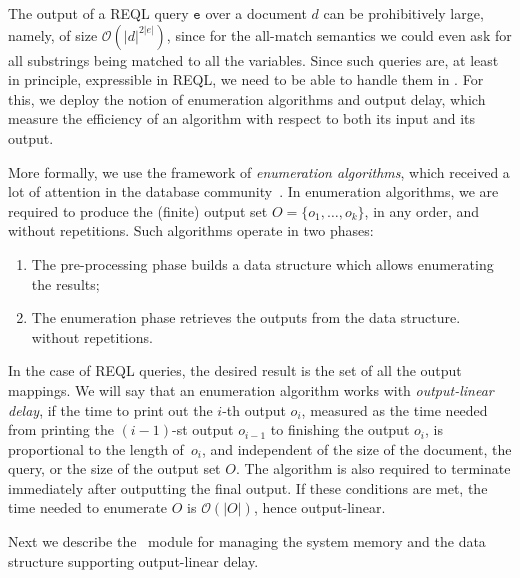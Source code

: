 
The output of a REQL query $\texttt{e}$ over a document $d$ can be prohibitively
large, namely, of size $\mathcal{O}(|d|^{2|e|})$, since for the all-match
semantics we could even ask for all substrings being matched to all the
variables. Since such queries are, at least in principle, expressible in REQL,
we need to be able to handle them in \rematch. For this, we deploy the notion of
enumeration algorithms and output delay, which measure the efficiency of an
algorithm  %
with respect to both its input and its output.

More formally, we use the framework of \emph{enumeration algorithms}, which
received a lot of attention in the database
community~\cite{AmarilliBMN-tods21,FlorenzanoRUVV20,LosemannM-lics14,SchweikardtSV-jacm22,BerkholzGS-siglog20,Segoufin13,IdrisUVVL-vldbj20,IdrisUV-sigmod17,TziavelisAGRY-pvldb20}.
In enumeration algorithms, we are required to produce the (finite) output set $O
= \{o_1,\ldots ,o_k\}$, in any order, and without repetitions. Such algorithms
operate in two phases:
\begin{enumerate}
	\item The pre-processing phase builds a data structure which allows
	enumerating the results;
	\item The enumeration phase retrieves the outputs from the data structure.%
	without repetitions.
\end{enumerate}
In the case of REQL queries, the desired result is the set of all the output
mappings. We will say that an enumeration algorithm works with
\emph{output-linear delay}, if the time to print out the $i$-th output $o_i$,
measured as the time needed from printing the $(i-1)$-st output $o_{i-1}$ to
finishing the output $o_i$, is proportional to the length of~$o_i$, and
independent of the size of the document, the query, or the size of the output
set $O$. The algorithm is also required to terminate immediately after
outputting the final output. If these conditions are met, the time needed to
enumerate $O$ is $\mathcal{O}(|O|)$, hence output-linear. 

Next we describe the \rematch\ module for managing the system memory and the
data structure supporting output-linear delay.

